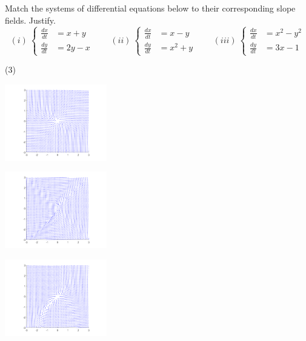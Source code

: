\begin{exercise}
Match the systems of differential equations below to their corresponding slope fields. Justify.
\begin{equation*}
(i)\ \begin{cases} \frac{dx}{dt} &= x+y \\ \frac{dy}{dt} &= 2y-x \end{cases} \qquad (ii)\ \begin{cases} \frac{dx}{dt} &= x-y \\ \frac{dy}{dt} &= x^2 + y \end{cases} \qquad (iii)\ \begin{cases} \frac{dx}{dt} &= x^2 - y^2 \\ \frac{dy}{dt} &= 3x-1 \end{cases}
\end{equation*}
\begin{tasks}(3)
\task
\parbox[c]{2in}{\includegraphics[width=1.75in]{Images/sysslopeEx1_1}}
\task
\parbox[c]{2in}{\includegraphics[width=1.75in]{Images/sysslopeEx1_3}}
\task
\parbox[c]{2in}{\includegraphics[width=1.75in]{Images/sysslopeEx1_2}}
\end{tasks}
\end{exercise}

